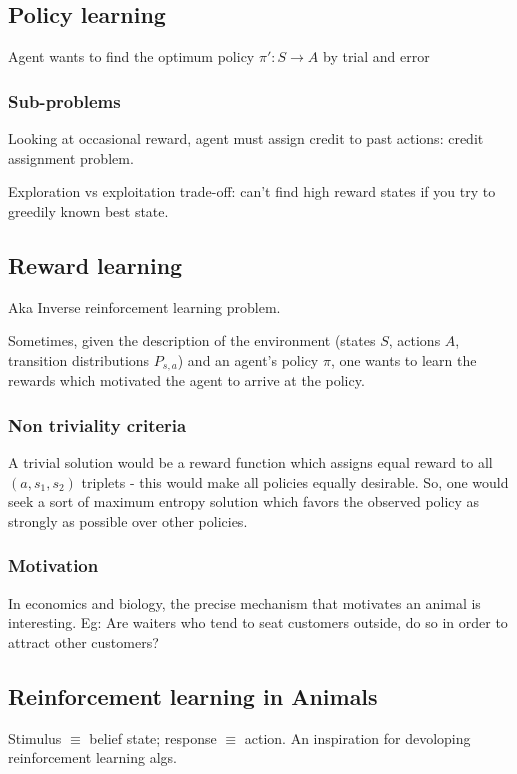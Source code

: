 \documentclass[oneside, article]{memoir}
\begin{document}
\subsection{Policy learning}
Agent wants to find the optimum policy $\pi':S \to A$ by trial and error

\subsubsection{Sub-problems}
Looking at occasional reward, agent must assign credit to past actions: credit assignment problem.

Exploration vs exploitation trade-off: can't find high reward states if you try to greedily known best state.

\subsection{Reward learning}
Aka Inverse reinforcement learning problem.

Sometimes, given the description of the environment (states $S$, actions $A$, transition distributions $P_{s, a}$) and an agent's policy $\pi$, one wants to learn the rewards which motivated the agent to arrive at the policy.

\subsubsection{Non triviality criteria}
A trivial solution would be a reward function which assigns equal reward to all $(a, s_1, s_2)$ triplets - this would make all policies equally desirable. So, one would seek a sort of maximum entropy solution which favors the observed policy as strongly as possible over other policies.

\subsubsection{Motivation}
In economics and biology, the precise mechanism that motivates an animal is interesting. Eg: Are waiters who tend to seat customers outside, do so in order to attract other customers? \tbc

\subsection{Reinforcement learning in Animals}
Stimulus $\equiv$ belief state; response $\equiv$ action. An inspiration for devoloping reinforcement learning algs.
\end{document}
